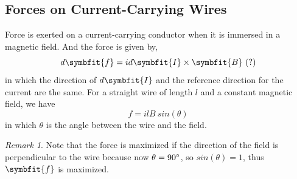 \documentclass[math,code]{amznotes}
\theoremstyle{remark}
\newtheorem*{remark}{Remark}
\begin{document}
\subsection{Forces on Current-Carrying Wires}
Force is exerted on a current-carrying conductor when it is immersed in a magnetic field. And the force is given by,
\begin{equation}
    d\symbfit{f} = id\symbfit{I} \times \symbfit{B} ~(?)
\end{equation}
in which the direction of $d\symbfit{I}$ and the reference direction for the current are the same. \newline
For a straight wire of length $l$ and a constant magnetic field, we have
\begin{equation}
    f=ilB~sin(\theta)
\end{equation}
in which $\theta$ is the angle between the wire and the field.
\begin{notebox}
    \begin{remark}
        Note that the force is maximized if the direction of the field is perpendicular to the wire because now $\theta=90\degree$, so $sin(\theta)=1$, thus $\symbfit{f}$ is maximized.
    \end{remark}
\end{notebox}
\end{document}
